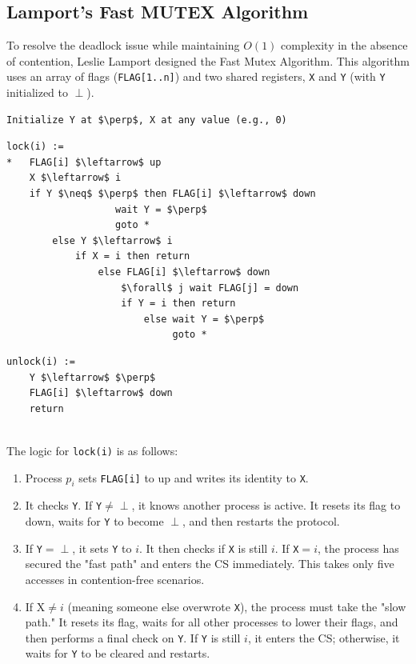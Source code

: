 \subsection{Lamport’s Fast MUTEX Algorithm}
To resolve the deadlock issue while maintaining $O(1)$ complexity in the absence of contention, Leslie Lamport designed the Fast Mutex Algorithm. This algorithm uses an array of flags (\texttt{FLAG[1..n]}) and two shared registers, \texttt{X} and \texttt{Y} (with \texttt{Y} initialized to $\perp$).

\begin{minipage}{\textwidth}
\begin{lstlisting}[mathescape]
Initialize Y at $\perp$, X at any value (e.g., 0)
\end{lstlisting}
\begin{lstlisting}[mathescape]
lock(i) :=
*   FLAG[i] $\leftarrow$ up
    X $\leftarrow$ i
    if Y $\neq$ $\perp$ then FLAG[i] $\leftarrow$ down
                   wait Y = $\perp$
                   goto *
        else Y $\leftarrow$ i
            if X = i then return
                else FLAG[i] $\leftarrow$ down
                    $\forall$ j wait FLAG[j] = down
                    if Y = i then return
                        else wait Y = $\perp$
                             goto *
\end{lstlisting}
\begin{lstlisting}[mathescape]
unlock(i) :=
    Y $\leftarrow$ $\perp$
    FLAG[i] $\leftarrow$ down
    return
\end{lstlisting}
\end{minipage}\\

The logic for \texttt{lock(i)} is as follows:
\begin{enumerate}
    \item Process $p_i$ sets \texttt{FLAG[i]} to up and writes its identity to \texttt{X}.
    \item It checks \texttt{Y}. If \texttt{Y}$\neq\perp$, it knows another process is active. It resets its flag to down, waits for \texttt{Y} to become $\perp$, and then restarts the protocol.
    \item If \texttt{Y}$=\perp$, it sets \texttt{Y} to $i$. It then checks if \texttt{X} is still $i$. If \texttt{X}$=i$, the process has secured the "fast path" and enters the CS immediately. This takes only five accesses in contention-free scenarios.
    \item If X$\neq i$ (meaning someone else overwrote \texttt{X}), the process must take the "slow path." It resets its flag, waits for all other processes to lower their flags, and then performs a final check on \texttt{Y}. If \texttt{Y} is still $i$, it enters the CS; otherwise, it waits for \texttt{Y} to be cleared and restarts.
\end{enumerate}


